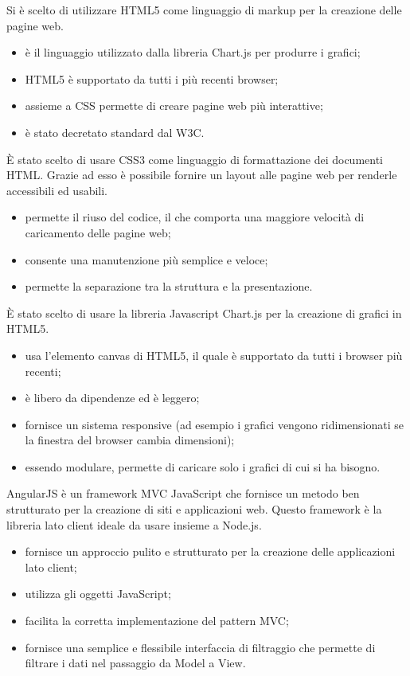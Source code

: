 Si è scelto di utilizzare HTML5 come linguaggio di markup per la creazione delle pagine web.
\begin{itemize}
\item è il linguaggio utilizzato dalla libreria Chart.js per produrre i grafici;
\item HTML5 è supportato da tutti i più recenti browser;
\item assieme a CSS permette di creare pagine web più interattive;
\item è stato decretato standard dal W3C.
\end{itemize}

È stato scelto di usare CSS3 come linguaggio di formattazione dei documenti HTML. Grazie ad esso è possibile fornire un layout alle pagine web per renderle accessibili ed usabili.
\begin{itemize}
\item permette il riuso del codice, il che comporta una maggiore velocità di caricamento delle pagine web;
\item consente una manutenzione più semplice e veloce;
\item permette la separazione tra la struttura e la presentazione.
\end{itemize}

È stato scelto di usare la libreria Javascript Chart.js per la creazione di grafici in HTML5.
\begin{itemize}
\item usa l'elemento canvas di HTML5, il quale è supportato da tutti i browser più recenti;
\item è libero da dipendenze ed è leggero;
\item fornisce un sistema responsive (ad esempio i grafici vengono ridimensionati se la finestra del browser cambia dimensioni);
\item essendo modulare, permette di caricare solo i grafici di cui si ha bisogno.
\end{itemize}

AngularJS è un framework MVC JavaScript che fornisce un metodo ben strutturato per la creazione di siti e applicazioni web. Questo framework è la libreria lato client ideale da usare insieme a Node.js.
\begin{itemize}
\item fornisce un approccio pulito e strutturato per la creazione delle applicazioni lato client;
\item utilizza gli oggetti JavaScript;
\item facilita la corretta implementazione del pattern MVC;
\item fornisce una semplice e flessibile interfaccia di filtraggio che permette di filtrare i dati nel passaggio da Model a View.
\end{itemize}